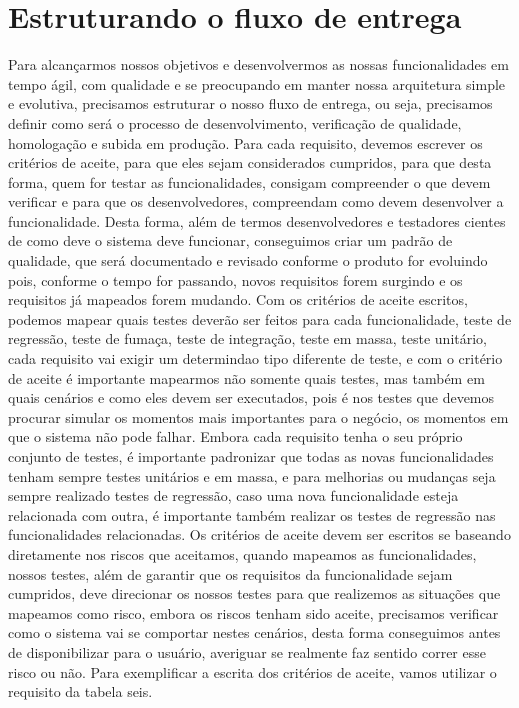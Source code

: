     \section{Estruturando o fluxo de entrega}
      Para alcançarmos nossos objetivos e desenvolvermos as nossas funcionalidades
      em tempo ágil, com qualidade e se preocupando em manter nossa arquitetura
      simple e evolutiva, precisamos estruturar o nosso fluxo de entrega, ou seja,
      precisamos definir como será o processo de desenvolvimento, verificação de
      qualidade, homologação e subida em produção. \newline
      Para cada requisito, devemos escrever os critérios de aceite, para que eles
      sejam considerados cumpridos, para que desta forma, quem for testar as
      funcionalidades, consigam compreender o que devem verificar e para que os
      desenvolvedores, compreendam como devem desenvolver a funcionalidade. Desta
      forma, além de termos desenvolvedores e testadores cientes de como deve
      o sistema deve funcionar, conseguimos criar um padrão de qualidade, que será
      documentado e revisado conforme o produto for evoluindo pois, conforme o tempo
      for passando, novos requisitos forem surgindo e os requisitos já mapeados
      forem mudando. Com os critérios de aceite escritos, podemos mapear quais
      testes deverão ser feitos para cada funcionalidade, teste de regressão, teste
      de fumaça, teste de integração, teste em massa, teste unitário, cada requisito
      vai exigir um determindao tipo diferente de teste, e com o critério de aceite
      é importante mapearmos não somente quais testes, mas também em quais cenários
      e como eles devem ser executados, pois é nos testes que devemos procurar simular
      os momentos mais importantes para o negócio, os momentos em que o sistema não
      pode falhar. Embora cada requisito tenha o seu próprio conjunto de testes,
      é importante padronizar que todas as novas funcionalidades tenham sempre testes
      unitários e em massa, e para melhorias ou mudanças seja sempre realizado testes
      de regressão, caso uma nova funcionalidade esteja relacionada com outra, é
      importante também realizar os testes de regressão nas funcionalidades
      relacionadas. Os critérios de aceite devem ser escritos se baseando diretamente
      nos riscos que aceitamos, quando mapeamos as funcionalidades, nossos testes,
      além de garantir que os requisitos da funcionalidade sejam cumpridos, deve
      direcionar os nossos testes para que realizemos as situações que mapeamos como
      risco, embora os riscos tenham sido aceite, precisamos verificar como o sistema
      vai se comportar nestes cenários, desta forma conseguimos antes de disponibilizar
      para o usuário, averiguar se realmente faz sentido correr esse risco ou não. \newline
      Para exemplificar a escrita dos critérios de aceite, vamos utilizar o requisito
      da tabela seis. \newline

